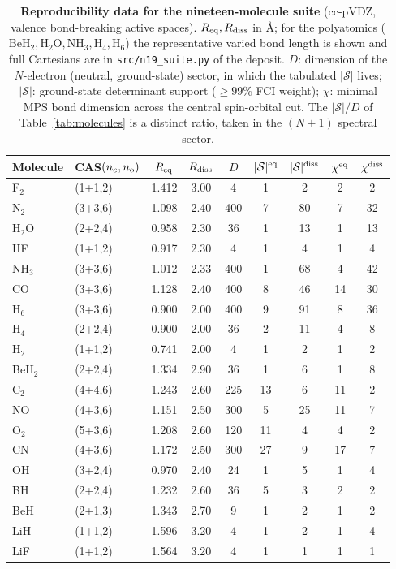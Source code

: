 \begin{table}[tp]\centering\small
\caption{\textbf{Reproducibility data for the nineteen-molecule suite} (cc-pVDZ, valence bond-breaking
active spaces). $R_{\rm eq},R_{\rm diss}$ in \AA{}; for the polyatomics ($\mathrm{BeH_2},\mathrm{H_2O},
\mathrm{NH_3},\mathrm{H_4},\mathrm{H_6}$) the representative varied bond length is shown and full
Cartesians are in \texttt{src/n19\_suite.py} of the deposit. $D$: dimension of the $N$-electron (neutral, ground-state) sector,
in which the tabulated $|\mathcal S|$ lives; $|\mathcal S|$: ground-state determinant support ($\ge99\%$
FCI weight); $\chi$: minimal MPS bond dimension across the central spin-orbital cut. The $|\mathcal S|/D$
of Table~\ref{tab:molecules} is a distinct ratio, taken in the $(N{\pm}1)$ spectral sector.}
\label{tab:repro}
\begin{tabular}{llccccccc}\hline\hline
Molecule & CAS$(n_e,n_{\rm o})$ & $R_{\rm eq}$ & $R_{\rm diss}$ & $D$ & $|\mathcal S|^{\rm eq}$ & $|\mathcal S|^{\rm diss}$ & $\chi^{\rm eq}$ & $\chi^{\rm diss}$ \\ \hline
F$_2$ & (1+1,2) & 1.412 & 3.00 & 4 & 1 & 2 & 2 & 2 \\
N$_2$ & (3+3,6) & 1.098 & 2.40 & 400 & 7 & 80 & 7 & 32 \\
H$_2$O & (2+2,4) & 0.958 & 2.30 & 36 & 1 & 13 & 1 & 13 \\
HF & (1+1,2) & 0.917 & 2.30 & 4 & 1 & 4 & 1 & 4 \\
NH$_3$ & (3+3,6) & 1.012 & 2.33 & 400 & 1 & 68 & 4 & 42 \\
CO & (3+3,6) & 1.128 & 2.40 & 400 & 8 & 46 & 14 & 30 \\
H$_6$ & (3+3,6) & 0.900 & 2.00 & 400 & 9 & 91 & 8 & 36 \\
H$_4$ & (2+2,4) & 0.900 & 2.00 & 36 & 2 & 11 & 4 & 8 \\
H$_2$ & (1+1,2) & 0.741 & 2.00 & 4 & 1 & 2 & 1 & 2 \\
BeH$_2$ & (2+2,4) & 1.334 & 2.90 & 36 & 1 & 6 & 1 & 8 \\
C$_2$ & (4+4,6) & 1.243 & 2.60 & 225 & 13 & 6 & 11 & 2 \\
NO & (4+3,6) & 1.151 & 2.50 & 300 & 5 & 25 & 11 & 7 \\
O$_2$ & (5+3,6) & 1.208 & 2.60 & 120 & 11 & 4 & 4 & 2 \\
CN & (4+3,6) & 1.172 & 2.50 & 300 & 27 & 9 & 17 & 7 \\
OH & (3+2,4) & 0.970 & 2.40 & 24 & 1 & 5 & 1 & 4 \\
BH & (2+2,4) & 1.232 & 2.60 & 36 & 5 & 3 & 2 & 2 \\
BeH & (2+1,3) & 1.343 & 2.70 & 9 & 1 & 2 & 1 & 2 \\
LiH & (1+1,2) & 1.596 & 3.20 & 4 & 1 & 2 & 1 & 4 \\
LiF & (1+1,2) & 1.564 & 3.20 & 4 & 1 & 1 & 1 & 1 \\
\hline\hline\end{tabular}
\end{table}

